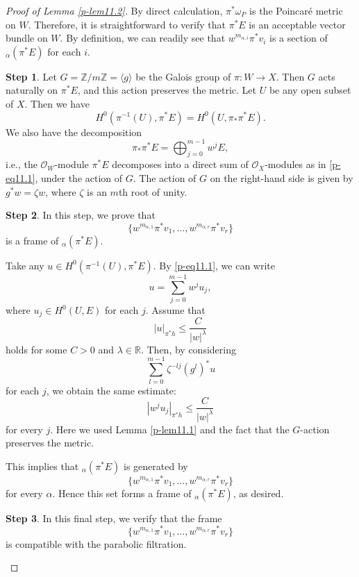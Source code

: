 \documentclass[12pt,twoside]{amsart}
\theoremstyle{definition}
\newtheorem{step}{Step}
\begin{document}
\begin{proof}[Proof of Lemma \ref{p-lem11.2}] 
By direct calculation, $\pi^* \omega_P$ is the Poincar\'e metric on $W$.  
Therefore, it is straightforward to verify that $\pi^* E$ is an acceptable vector bundle on $W$.  
By definition, we can readily see that $w^{m_{\alpha,i}} \pi^* v_i$ 
is a section of ${}_\alpha(\pi^* E)$ for each $i$.

\setcounter{step}{0}
\begin{step}\label{p-step11.2-1}
Let $G = \mathbb{Z}/m\mathbb{Z} = \langle g \rangle$ be the Galois group of $\pi \colon W \to X$. 
Then $G$ acts naturally on $\pi^*E$, and this action preserves the metric. 
Let $U$ be any open subset of $X$. 
Then we have 
\[
H^0(\pi^{-1}(U), \pi^*E) = H^0(U, \pi_* \pi^*E).
\] 
We also have the decomposition
\begin{equation}\label{p-eq11.1}
\pi_* \pi^* E = \bigoplus_{j=0}^{m-1} w^j E,
\end{equation} 
i.e., the $\mathcal{O}_W$-module 
$\pi^*E$ decomposes into a direct sum 
of $\mathcal{O}_X$-modules as in \eqref{p-eq11.1}, under the action of $G$. 
The action of $G$ on the right-hand side 
is given by $g^* w = \zeta w$, where $\zeta$ is an $m$th root of unity. 
\end{step}

\begin{step}\label{p-step11.2-2}
In this step, we prove that 
\[
\{w^{m_{\alpha,1}} \pi^*v_1, \ldots, w^{m_{\alpha,r}} \pi^*v_r\}
\] 
is a frame of ${}_\alpha(\pi^*E)$. 

Take any $u \in H^0(\pi^{-1}(U), \pi^*E)$. 
By \eqref{p-eq11.1}, we can write 
\[
u = \sum_{j=0}^{m-1} w^j u_j,
\] 
where $u_j \in H^0(U, E)$ for each $j$. 
Assume that 
\[
|u|_{\pi^*h} \leq \frac{C}{|w|^\lambda}
\] 
holds for some $C > 0$ and $\lambda \in \mathbb{R}$. 
Then, by considering 
\[
\sum_{l=0}^{m-1} \zeta^{-lj} (g^l)^* u
\] 
for each $j$, we obtain the same estimate:
\[
|w^j u_j|_{\pi^*h} \leq \frac{C}{|w|^\lambda}
\] 
for every $j$. 
Here we used Lemma \ref{p-lem11.1} 
and the fact that the $G$-action preserves the metric. 

This implies that ${}_\alpha(\pi^*E)$ is generated by 
\[
\{w^{m_{\alpha,1}} \pi^*v_1, \ldots, w^{m_{\alpha,r}} \pi^*v_r\}
\] 
for every $\alpha$. 
Hence this set forms a frame of ${}_\alpha(\pi^*E)$, as desired.
\end{step}

\begin{step}\label{p-step11.2-3}
In this final step, we verify that the frame 
\[
\{w^{m_{\alpha,1}} \pi^*v_1, \ldots, w^{m_{\alpha,r}} \pi^*v_r\}
\] 
is compatible with the parabolic filtration. 


\end{step}
\end{proof}
\end{document}
